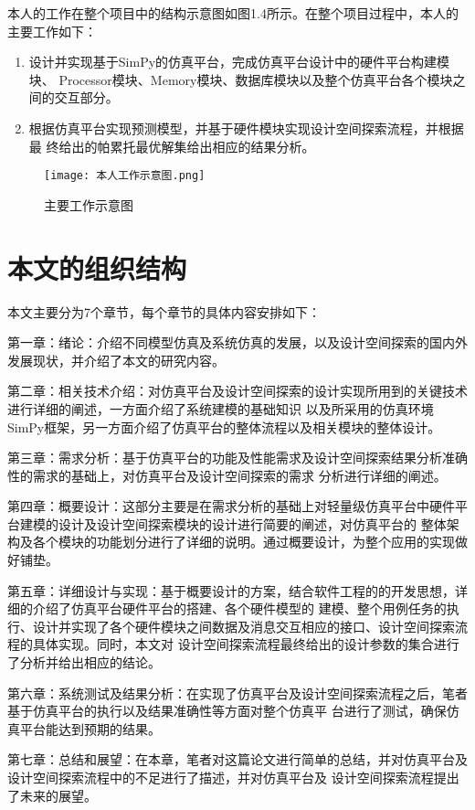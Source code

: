本人的工作在整个项目中的结构示意图如图1.4所示。在整个项目过程中，本人的主要工作如下：

\begin{enumerate}
    \item 设计并实现基于SimPy的仿真平台，完成仿真平台设计中的硬件平台构建模块、
    Processor模块、Memory模块、数据库模块以及整个仿真平台各个模块之间的交互部分。
    \item 根据仿真平台实现预测模型，并基于硬件模块实现设计空间探索流程，并根据最
    终给出的帕累托最优解集给出相应的结果分析。
\end{enumerate}

\begin{figure}
    \centering
    \texttt{[image: 本人工作示意图.png]}
    \caption{主要工作示意图}
    \label{fig:badge}
\end{figure}


\section{本文的组织结构}
本文主要分为7个章节，每个章节的具体内容安排如下：

第一章：绪论：介绍不同模型仿真及系统仿真的发展，以及设计空间探索的国内外发展现状，并介绍了本文的研究内容。

第二章：相关技术介绍：对仿真平台及设计空间探索的设计实现所用到的关键技术进行详细的阐述，一方面介绍了系统建模的基础知识
以及所采用的仿真环境SimPy框架，另一方面介绍了仿真平台的整体流程以及相关模块的整体设计。

第三章：需求分析：基于仿真平台的功能及性能需求及设计空间探索结果分析准确性的需求的基础上，对仿真平台及设计空间探索的需求
分析进行详细的阐述。

第四章：概要设计：这部分主要是在需求分析的基础上对轻量级仿真平台中硬件平台建模的设计及设计空间探索模块的设计进行简要的阐述，对仿真平台的
整体架构及各个模块的功能划分进行了详细的说明。通过概要设计，为整个应用的实现做好铺垫。

第五章：详细设计与实现：基于概要设计的方案，结合软件工程的的开发思想，详细的介绍了仿真平台硬件平台的搭建、各个硬件模型的
建模、整个用例任务的执行、设计并实现了各个硬件模块之间数据及消息交互相应的接口、设计空间探索流程的具体实现。同时，本文对
设计空间探索流程最终给出的设计参数的集合进行了分析并给出相应的结论。

第六章：系统测试及结果分析：在实现了仿真平台及设计空间探索流程之后，笔者基于仿真平台的执行以及结果准确性等方面对整个仿真平
台进行了测试，确保仿真平台能达到预期的结果。

第七章：总结和展望：在本章，笔者对这篇论文进行简单的总结，并对仿真平台及设计空间探索流程中的不足进行了描述，并对仿真平台及
设计空间探索流程提出了未来的展望。


